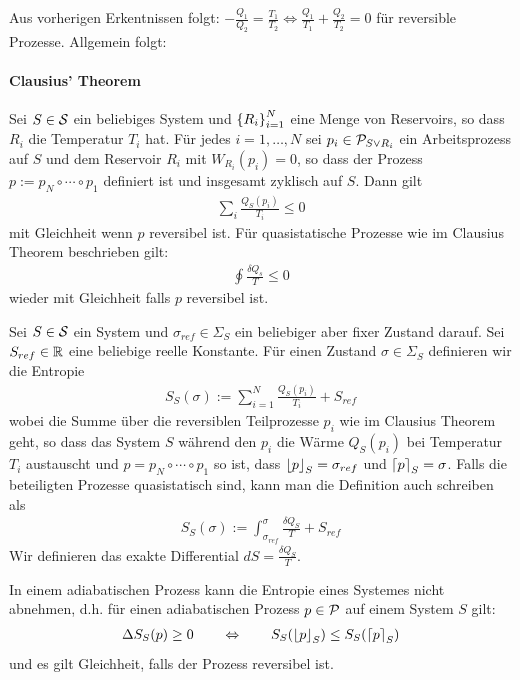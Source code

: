 Aus vorherigen Erkentnissen folgt: $- \frac{Q_1}{Q_2} = \frac{T_1}{T_2}
\Leftrightarrow \frac{Q_1}{T_1} + \frac{Q_2}{T_2} = 0$ für reversible
Prozesse. Allgemein folgt:

\paragraph{Clausius' Theorem}
Sei $S \in \S$ ein beliebiges System und $\geschwungeneklammer{R_i}_{i=1}^N$
eine Menge von Reservoirs, so dass $R_i$ die Temperatur $T_i$ hat. Für jedes
$i=1,\dots,N$ sei $p_i \in \P_{S \vee R_i}$ ein Arbeitsprozess auf $S$ und
dem Reservoir $R_i$ mit $W_{R_i}(p_i) = 0$, so dass der Prozess $p := p_N
\circ \dotsb \circ p_1$ definiert ist und insgesamt zyklisch auf $S$. Dann gilt
\begin{align*}
    \sum_i \frac{Q_S (p_i)}{T_i} \leq 0
\end{align*}
mit Gleichheit wenn $p$ reversibel ist.
Für quasistatische Prozesse wie im Clausius Theorem beschrieben gilt:
\begin{align*}
    \oint \frac{\delta Q_s}{T} \leq 0
\end{align*}
wieder mit Gleichheit falls $p$ reversibel ist.

\begin{definition}[Entropie]
    Sei $S \in \S$ ein System und $\sigma_{ref} \in \Sigma_S$ ein beliebiger
    aber fixer Zustand darauf. Sei $S_{ref} \in \R$ eine beliebige reelle
    Konstante. Für einen Zustand $\sigma \in \Sigma_S$ definieren wir die
    Entropie
    \begin{align*}
        S_S (\sigma) := \sum_{i=1}^N \frac{Q_S (p_i)}{T_i} + S_{ref}
    \end{align*}
    wobei die Summe über die reversiblen Teilprozesse $p_i$ wie im Clausius
    Theorem geht, so dass das System $S$ während den $p_i$ die Wärme $Q_S(p_i)$
    bei Temperatur $T_i$ austauscht und $p = p_N \circ \dotsb \circ p_1$ so ist,
    dass $\floor{p}_S = \sigma_{ref}$ und $\ceil{p}_S = \sigma$. Falls die
    beteiligten Prozesse quasistatisch sind, kann man die Definition auch
    schreiben als
    \begin{align*}
        S_S (\sigma) := \int_{\sigma_{ref}}^\sigma \frac{\delta Q_S}{T} + S_{ref}
    \end{align*}
    Wir definieren das exakte Differential $dS = \frac{\delta Q_S}{T}$.
\end{definition}

\begin{theorem}[Entropiesatz]
    In einem adiabatischen Prozess kann die Entropie eines Systemes nicht
    abnehmen, d.h. für einen adiabatischen Prozess $p \in \P$ auf einem
    System $S$ gilt:
    \begin{align*}
        \Delta S_S (p) \geq 0
        \hspace{20pt} \Leftrightarrow \hspace{20pt}
        S_S(\floor{p}_S) \leq S_S(\ceil{p}_S)
    \end{align*}
    und es gilt Gleichheit, falls der Prozess reversibel ist.
\end{theorem}


